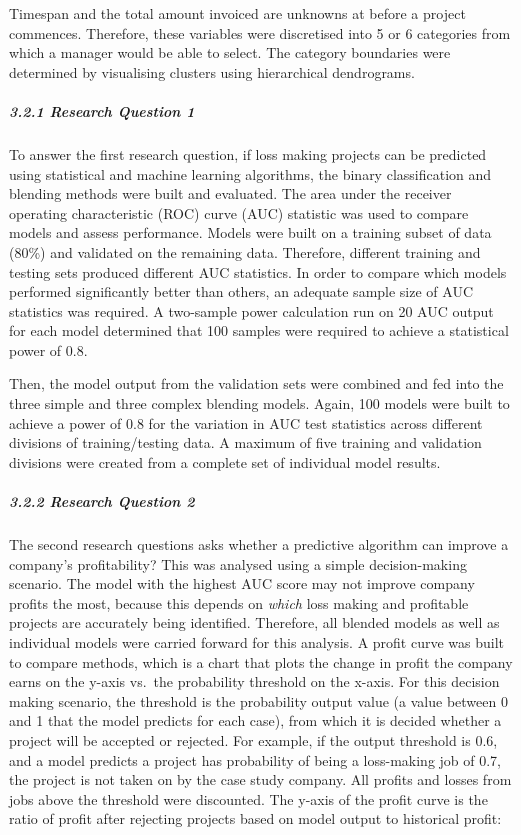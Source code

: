 \documentclass[]{elsarticle} %
\begin{document}
Timespan and the total amount invoiced are unknowns at before a project
commences. Therefore, these variables were discretised into 5 or 6
categories from which a manager would be able to select. The category
boundaries were determined by visualising clusters using hierarchical
dendrograms.

\subparagraph{3.2.1 Research Question 1}\label{research-question-1}

To answer the first research question, if loss making projects can be
predicted using statistical and machine learning algorithms, the binary
classification and blending methods were built and evaluated. The area
under the receiver operating characteristic (ROC) curve (AUC) statistic
was used to compare models and assess performance. Models were built on
a training subset of data (80\%) and validated on the remaining data.
Therefore, different training and testing sets produced different AUC
statistics. In order to compare which models performed significantly
better than others, an adequate sample size of AUC statistics was
required. A two-sample power calculation run on 20 AUC output for each
model determined that 100 samples were required to achieve a statistical
power of 0.8.

Then, the model output from the validation sets were combined and fed
into the three simple and three complex blending models. Again, 100
models were built to achieve a power of 0.8 for the variation in AUC
test statistics across different divisions of training/testing data. A
maximum of five training and validation divisions were created from a
complete set of individual model results.

\subparagraph{3.2.2 Research Question 2}\label{research-question-2}

The second research questions asks whether a predictive algorithm can
improve a company's profitability? This was analysed using a simple
decision-making scenario. The model with the highest AUC score may not
improve company profits the most, because this depends on \emph{which}
loss making and profitable projects are accurately being identified.
Therefore, all blended models as well as individual models were carried
forward for this analysis. A profit curve was built to compare methods,
which is a chart that plots the change in profit the company earns on
the y-axis vs.~the probability threshold on the x-axis. For this
decision making scenario, the threshold is the probability output value
(a value between 0 and 1 that the model predicts for each case), from
which it is decided whether a project will be accepted or rejected. For
example, if the output threshold is 0.6, and a model predicts a project
has probability of being a loss-making job of 0.7, the project is not
taken on by the case study company. All profits and losses from jobs
above the threshold were discounted. The y-axis of the profit curve is
the ratio of profit after rejecting projects based on model output to
historical profit:
\end{document}
